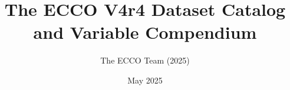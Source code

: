 \pagestyle{myfancy}

\title{The ECCO V4r4 Dataset Catalog and Variable Compendium}
\author{The ECCO Team (2025)}
\date {May 2025}

\renewcommand{\headrulewidth}{0pt}


\setlength{\headheight}{20.98703pt}
\addtolength{\topmargin}{-8.98703pt}

\renewcommand{\cellalign}{tl}


